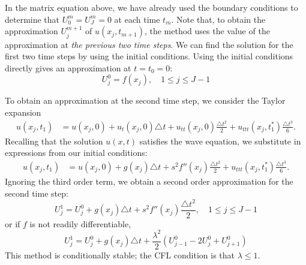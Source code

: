 In the matrix equation above, we have already used the boundary conditions to determine that $U_{0}^{m} = U_{J}^{m} = 0$ at each time $t_m$.
Note that, to obtain the approximation $U_{j}^{m+1}$ of $u(x_j,t_{m+1})$, the method uses the value of the approximation at \emph{the previous two time steps}.
We can find the solution for the first two time steps by using the initial conditions.
Using the initial conditions directly gives an approximation at $t = t_0 = 0:$
\[U_{j}^{0} = f(x_j), \quad 1 \leq j \leq J-1\]

To obtain an approximation at the second time step, we consider the Taylor expansion
\begin{align*}
	u(x_j,t_1) &= u(x_j, 0) + u_t(x_j,0) \triangle t + u_{tt}(x_j,0) \frac{\triangle t^2}{2} + u_{ttt}(x_j,t_1^*) \frac{\triangle t^3}{6}.
\end{align*}
Recalling that the solution $u(x,t)$ satisfies the wave equation, we substitute in expressions from our initial conditions:
\begin{align*}
	u(x_j,t_1) &= u(x_j, 0) +  g(x_j) \triangle t+ s^2 f''(x_j)\frac{\triangle t^2}{2} +  u_{ttt}(x_j,t_1^*) \frac{\triangle t^3}{6}.
\end{align*}
Ignoring the third order term, we obtain a second order approximation for the second time step:
\[U_{j}^{1}= U_{j}^{0} + g(x_j) \triangle t+ s^2 f''(x_j) \frac{\triangle t^2}{2}, \quad 1 \leq j \leq J-1\]
or if $f$ is not readily differentiable,
\[U_{j}^{1}= U_{j}^{0} + g(x_j) \triangle t+ \frac{\lambda^2}{2} (U^0_{j-1} -2 U^0_j + U^0_{j+1})\]
This method is conditionally stable; the CFL condition is that $\lambda \leq 1$.

